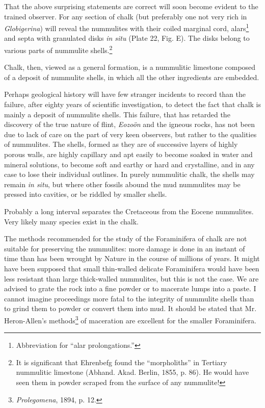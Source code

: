 \documentclass[a4paper, 12pt, oneside]{article}
\begin{document}
That the above surprising statements are correct will soon become evident to the trained observer. For any section of chalk (but preferably one not very rich in \emph{Globigerina}) will reveal the nummulites with their coiled marginal cord, alars\footnote{Abbreviation for ``alar prolongations.''} and septa with granulated disks \emph{in situ} (Plate 22, Fig. E). The disks belong to various parts of nummulite shells.\footnote{It is significant that Ehrenbefg found the ``morpholiths'' in Tertiary nummulitic limestone (Abhand. Akad. Berlin, 1855, p. 86). He would have seen them in powder scraped from the surface of any nummulite!}

Chalk, then, viewed as a general formation, is a nummulitic limestone composed of a deposit of nummulite shells, in which all the other ingredients are embedded.

Perhaps geological history will have few stranger incidents to record than the failure, after eighty years of scientific investigation, to detect the fact that chalk is mainly a deposit of nummulite shells. This failure, that has retarded the discovery of the true nature of flint, \emph{Eozoön} and the igneous rocks, has not been due to lack of care on the part of very keen observers, but rather to the qualities of nummulites. The shells, formed as they are of successive layers of highly porous walls, are highly capillary and apt easily to become soaked in water and mineral solutions, to become soft and earthy or hard and crystalline, and in any case to lose their individual outlines. In purely nummulitic chalk, the shells may remain \emph{in situ}, but where other fossils abound the mud nummulites may be pressed into cavities, or be riddled by smaller shells.

Probably a long interval separates the Cretaceous from the Eocene nummulites. Very likely many species exist in the chalk.

The methods recommended for the study of the Foraminifera of chalk are not suitable for preserving the nummulites: more damage is done in an instant of time than has been wrought by Nature in the course of millions of years. It might have been supposed that small thin-walled delicate Foraminifera would have been less resistant than large thick-walled nummulites, but this is not the case. We are advised to grate the rock into a fine powder or to macerate lumps into a paste. I cannot imagine proceedings more fatal to the integrity of nummulite shells than to grind them to powder or convert them into mud. It should be stated that Mr. Heron-Allen's methods\footnote{\emph{Prolegomena}, 1894, p. 12.} of maceration are excellent for the smaller Foraminifera.
\end{document}
